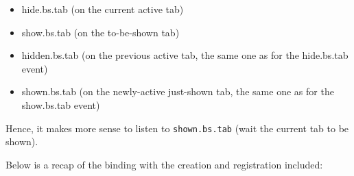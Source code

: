 \documentclass[]{book}
\newenvironment{Shaded}{\begin{snugshade}}{\end{snugshade}}
\newcommand{\AttributeTok}[1]{\textcolor[rgb]{0.77,0.63,0.00}{#1}}
\newcommand{\CommentTok}[1]{\textcolor[rgb]{0.56,0.35,0.01}{\textit{#1}}}
\newcommand{\KeywordTok}[1]{\textcolor[rgb]{0.13,0.29,0.53}{\textbf{#1}}}
\newcommand{\NormalTok}[1]{#1}
\newcommand{\OperatorTok}[1]{\textcolor[rgb]{0.81,0.36,0.00}{\textbf{#1}}}
\newcommand{\StringTok}[1]{\textcolor[rgb]{0.31,0.60,0.02}{#1}}
\providecommand{\tightlist}{%
  \setlength{\itemsep}{0pt}\setlength{\parskip}{0pt}}
\begin{document}
\begin{itemize}
\tightlist
\item
  hide.bs.tab (on the current active tab)
\item
  show.bs.tab (on the to-be-shown tab)
\item
  hidden.bs.tab (on the previous active tab, the same one as for the hide.bs.tab event)
\item
  shown.bs.tab (on the newly-active just-shown tab, the same one as for the show.bs.tab event)
\end{itemize}

Hence, it makes more sense to listen to \texttt{shown.bs.tab} (wait the current tab to be shown).

\begin{Shaded}
\end{Shaded}

Below is a recap of the binding with the creation and registration included:
\end{document}
